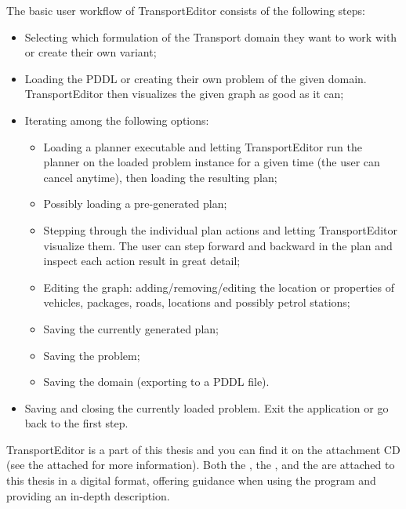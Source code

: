 The basic user workflow of TransportEditor consists of the following steps:
\begin{itemize}
\item Selecting which formulation of the Transport domain they want to work with or create their own variant;
\item Loading the PDDL or creating their own problem of the given domain. TransportEditor then visualizes the given graph as good as it can;
\item Iterating among the following options:
\begin{itemize}
\item Loading a planner executable and letting TransportEditor run the planner on the loaded problem instance for a given time (the user can cancel anytime),
then loading the resulting plan;
\item Possibly loading a pre-generated plan;
\item Stepping through the individual plan actions and letting TransportEditor visualize them.
The user can step forward and backward in the plan and inspect each action result in great detail;
\item Editing the graph: adding/removing/editing the location or properties of vehicles, packages, roads, locations and possibly petrol stations;
\item Saving the currently generated plan;
\item Saving the problem;
\item Saving the domain (exporting to a PDDL file).
\end{itemize}
\item Saving and closing the currently loaded problem. Exit the application or go back to the first step.
\end{itemize}

TransportEditor is a part of this thesis and you can find it on the attachment CD (see the attached  for more information). Both the ,
the , and the  are attached to this thesis in a digital format, offering guidance when
using the program and providing an in-depth description.

















